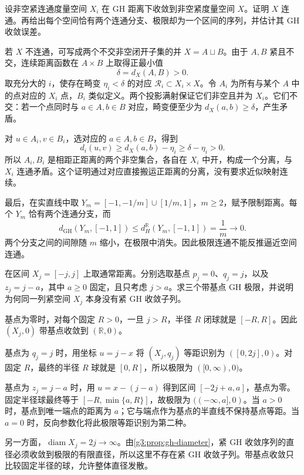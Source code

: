 \begin{exercise}\label{g3:ex:gh-connected-limit}
	设非空紧连通度量空间 \(X_i\) 在 GH 距离下收敛到非空紧度量空间 \(X\)。证明 \(X\) 连通。再给出每个空间恰有两个连通分支、极限却为一个区间的序列，并估计其 GH 收敛误差。
\end{exercise}
\begin{solution}
	若 \(X\) 不连通，可写成两个不交非空闭开子集的并 \(X=A\sqcup B\)。由于 \(A,B\) 紧且不交，连续距离函数在 \(A\times B\) 上取得正最小值
	\[
		\delta=d_X(A,B)>0.
	\]
	取充分大的 \(i\)，使存在畸变 \(\eta_i<\delta\) 的对应 \(\mathcal R_i\subset X_i\times X\)。令 \(A_i\) 为所有与某个 \(A\) 中的点对应的 \(X_i\) 点，\(B_i\) 类似定义。两个投影满射保证它们非空且并为 \(X_i\)。它们不交：若一个点同时与 \(a\in A,b\in B\) 对应，畸变便至少为 \(d_X(a,b)\ge\delta\)，产生矛盾。

	对 \(u\in A_i,v\in B_i\)，选对应的 \(a\in A,b\in B\)，得到
	\[
		d_i(u,v)\ge d_X(a,b)-\eta_i\ge\delta-\eta_i>0.
	\]
	所以 \(A_i,B_i\) 是相距正距离的两个非空集合，各自在 \(X_i\) 中开，构成一个分离，与 \(X_i\) 连通矛盾。这个证明通过对应直接搬运正距离的分离，没有要求近似映射连续。

	最后，在实直线中取 \(Y_m=[-1,-1/m]\cup[1/m,1]\)，\(m\ge2\)，赋予限制距离。每个 \(Y_m\) 恰有两个连通分支，而
	\[
		d_{\mathrm{GH}}(Y_m,[-1,1])
		\le d_H^{\mathbb R}(Y_m,[-1,1])=\frac1m\longrightarrow0.
	\]
	两个分支之间的间隙随 \(m\) 缩小，在极限中消失。因此极限连通不能反推逼近空间连通。
\end{solution}

\begin{exercise}\label{g3:ex:moving-basepoint-intervals}
	在区间 \(X_j=[-j,j]\) 上取通常距离。分别选取基点 \(p_j=0\)、\(q_j=j\)，以及 \(z_j=j-a\)，其中 \(a\ge0\) 固定，且只考虑 \(j>a\)。求三个带基点 GH 极限，并说明为何同一列紧空间 \(X_j\) 本身没有紧 GH 收敛子列。
\end{exercise}
\begin{solution}
	基点为零时，对每个固定 \(R>0\)，一旦 \(j>R\)，半径 \(R\) 闭球就是 \([-R,R]\)。因此 \((X_j,0)\) 带基点收敛到 \((\mathbb R,0)\)。

	基点为 \(q_j=j\) 时，用坐标 \(u=j-x\) 将 \((X_j,q_j)\) 等距识别为 \(([0,2j],0)\)。对固定 \(R\)，最终的半径 \(R\) 球就是 \([0,R]\)，所以极限为 \(([0,\infty),0)\)。

	基点为 \(z_j=j-a\) 时，用 \(u=x-(j-a)\) 得到区间 \([-2j+a,a]\)，基点为零。固定半径球最终等于 \([-R,\min\{a,R\}]\)，故极限为 \(((-\infty,a],0)\)。当 \(a>0\) 时，基点到唯一端点的距离为 \(a\)；它与端点作为基点的半直线不保持基点等距。当 \(a=0\) 时，反向参数化将此极限等距识别为第二种。

	另一方面，\(\operatorname{diam}X_j=2j\to\infty\)。由\cref{g3:prop:gh-diameter}，紧 GH 收敛序列的直径必须收敛到极限的有限直径，所以这里不存在紧 GH 收敛子列。带基点收敛只比较固定半径的球，允许整体直径发散。
\end{solution}

